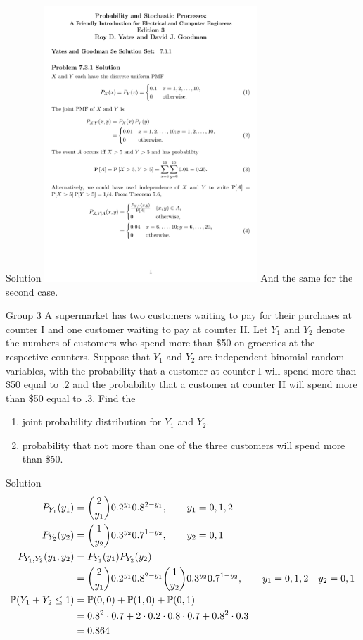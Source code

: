 \documentclass{article}
\begin{document}
\begin{solution}
    {Solution}
    \includegraphics[width=0.6\textwidth, center]{winlab-ms6Z3OUCPY-s.pdf}
    And the same for the second case.
\end{solution}

\begin{problem}
    {Group 3}
    A supermarket has two customers waiting to pay for their purchases at counter I and one customer waiting to pay at counter II. Let $Y_1$ and $Y_2$ denote the numbers of customers who spend more than \$50 on groceries at the respective counters. Suppose that $Y_1$ and $Y_2$ are independent binomial random variables, with the probability that a customer at counter I will spend more than \$50 equal to $.2$ and the probability that a customer at counter II will spend more than \$50 equal to $.3$. Find the
    \begin{enumerate}
        \item joint probability distribution for $Y_1$ and $Y_2$.
        \item probability that not more than one of the three customers will spend more than \$50.
    \end{enumerate}
\end{problem}

\begin{solution}
    {Solution}
    \begin{align*}
        P_{Y_1}(y_1) &= \binom{2}{y_1}0.2^{y_1}0.8^{2-y_1}, \qquad y_1=0,1,2 \\
        P_{Y_2}(y_2) &= \binom{1}{y_2}0.3^{y_2}0.7^{1-y_2}, \qquad y_2=0,1 \\
        P_{Y_1,Y_2}(y_1,y_2) &= P_{Y_1}(y_1)P_{Y_2}(y_2) \\
        &= \binom{2}{y_1}0.2^{y_1}0.8^{2-y_1}\binom{1}{y_2}0.3^{y_2}0.7^{1-y_2}, \qquad y_1=0,1,2 \quad y_2=0,1 \\
        \P{Y_1+Y_2\leq 1} &= \P{0,0} + \P{1,0} + \P{0,1} \\
        &= 0.8^2\cdot 0.7 + 2\cdot 0.2\cdot 0.8\cdot 0.7 + 0.8^2\cdot 0.3 \\
        &= 0.864
    \end{align*}
\end{solution}
\end{document}
